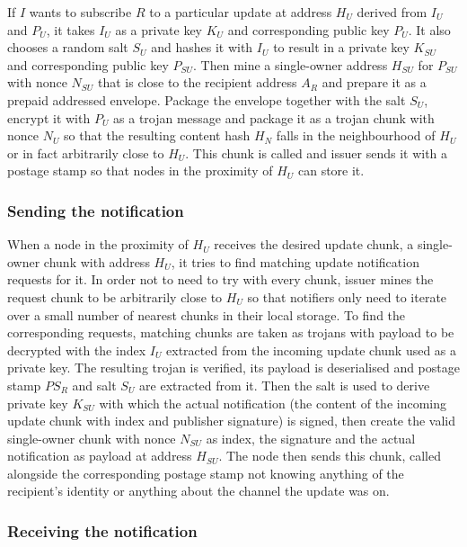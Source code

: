 If $I$  wants to subscribe $R$ to a  particular update at address $H_U$ derived from $I_U$ and $P_U$, it takes $I_U$ as a private key $K_U$ and corresponding public key $P_U$. It also chooses a random salt $S_U$ and hashes it with $I_U$ to result in a private key $K_{SU}$ and corresponding public key $P_{SU}$. Then mine a single-owner address $H_{SU}$ for $P_{SU}$ with nonce $N_{SU}$ that is close to the recipient address $A_R$ and prepare it as a prepaid addressed envelope. Package the envelope together with the salt $S_U$, encrypt it with $P_U$ as a trojan message and
package it as a trojan chunk with nonce $N_U$ so that the resulting content hash $H_N$ falls in the neighbourhood of $H_U$ or in fact arbitrarily close to $H_U$. This chunk is called  and issuer sends it with a postage stamp so that nodes in the proximity of $H_U$ can store it.


\subsubsection{Sending the notification}

When a node in the proximity of $H_U$ receives the desired update chunk, a single-owner chunk with address $H_U$, it tries to find matching update notification requests for it. In order not to need to try with every chunk, issuer mines the request chunk to be arbitrarily close to  $H_U$ so that notifiers only need to iterate over a small number of nearest chunks in their local storage. To find the corresponding requests, matching chunks are taken as trojans with payload to be decrypted with the index $I_U$ extracted from the incoming update chunk used as a private key. The resulting trojan is verified, its payload is deserialised and postage stamp $PS_R$ and salt $S_U$ are extracted from it. Then the salt is used to derive private key $K_{SU}$ with which the actual notification (the content of the incoming update chunk with index and publisher signature) is signed, then create the valid single-owner chunk with nonce $N_{SU}$ as index, the signature and the actual notification as payload at address $H_{SU}$. The node then sends this chunk, called  alongside the corresponding postage stamp not knowing anything of the recipient's identity or anything about the channel the update was on.


\subsubsection{Receiving the notification}

